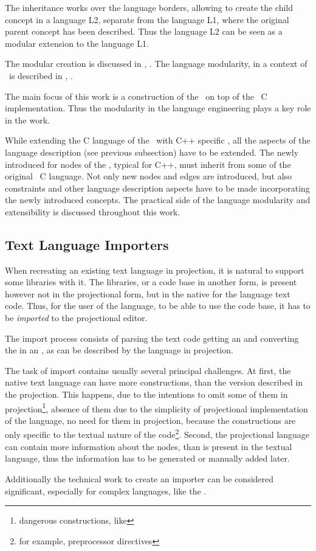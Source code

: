 
The inheritance works over the language borders, allowing to create the child concept
in a language L2, separate from the language L1, where the original parent concept has been described. Thus the language L2 can be seen as a modular extension to the
language L1. 

The modular  creation is discussed in \cite{1998_hudak_modular_dsl_and_tools}, \cite{2006_wyk_modular_dsl_extensions}. 
The language modularity, in a context of \jbmps\ is described in \cite{2012_ratiu_modular_dsls_and_analyses}, \cite{Voelter2011}.

The main focus of this work is a construction of the \cpppl\ on top of the \mbdr\ C implementation. Thus the modularity in the language engineering 
plays a key role in the work.

While extending the C language of the \mbdr\ with C++ specific , all the aspects of the language description (see previous subsection) have
to be extended. The newly introduced  for nodes of the , typical for C++, must inherit from some  of the original 
\mbp\ C language. Not only new nodes and edges are introduced, but also constraints and other language description aspects have to be made incorporating the
newly introduced concepts. The practical side of the language modularity and extensibility is discussed throughout this work.


\subsection{Text Language Importers}
\label{importers}

When recreating an existing text language in projection, it is natural to support some libraries with it. The libraries, or a code 
base in another form, is present however not in the projectional form, but in the native for the language text code. Thus, for the 
user of the language, to be able to use the code base, it has to be \emph{imported} to the projectional editor. 

The import process consists of parsing the text code getting an  and converting the  in an , as can
be described by the language in projection.

The task of import contains usually several principal challenges. At first, the native text language can have more 
constructions, than the version described in the projection. This happens, due to the intentions to omit some of them
in projection\footnote{dangerous constructions, like }, absence of them due to the simplicity of projectional 
implementation of the language, no need for them in projection, because the constructions are only specific to the textual nature of 
the code\footnote{for example, preprocessor directives}. Second, the projectional language can contain more information about the nodes,
than is present in the textual language, thus the information has to be generated or manually added later.

Additionally the technical work to create an importer can be considered significant, especially for complex languages, like the \cpppl.
